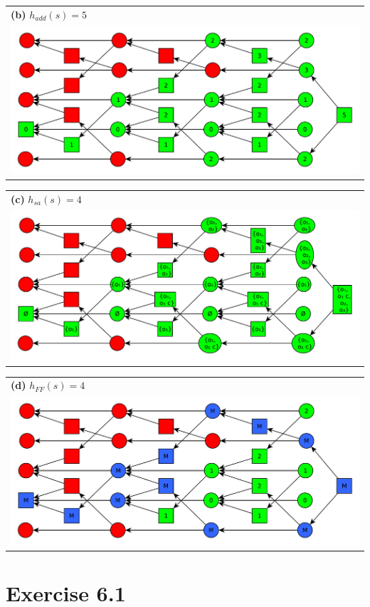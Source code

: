 \documentclass[11pt,a4paper]{article}
\begin{document}
\begin{tabular}{l} %
\textbf{(b)} $h_{add}(s)=5$\\
\includegraphics[scale=0.5]{g63b}\\
\end{tabular}

\begin{tabular}{l} %
\textbf{(c)} $h_{sa}(s)=4$\\
\includegraphics[scale=0.5]{g63c}\\
\end{tabular}

\begin{tabular}{l} %
\textbf{(d)} $h_{FF}(s)=4$\\
\includegraphics[scale=0.5]{g63d}\\
\end{tabular}


\section*{Exercise 6.1}
\end{document}
